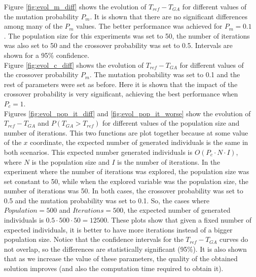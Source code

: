 \documentclass[10pt,a4paper]{article}
\begin{document}
Figure \ref{fig:evol_m_diff} shows the evolution of $T_{ref} - T_{GA}$ for different values of the mutation probability $P_m$. It is shown that there are no significant differences among many of the $P_m$ values. The better performance was achieved for $P_m = 0.1$. The population size for this experiments was set to 50, the number of iterations was also set to 50 and the crossover probability was set to 0.5. Intervals are shown for a 95\% confidence.\\

Figure \ref{fig:evol_c_diff} shows the evolution of $T_{ref} - T_{GA}$ for different values of the crossover probability $P_m$. The mutation probability was set to 0.1 and the rest of parameters were set as before. Here it is shown that the impact of the crossover probability is very significant, achieving the best performance when $P_c = 1$.\\

Figures \ref{fig:evol_pop_it_diff} and \ref{fig:evol_pop_it_worse} show the evolution of $T_{ref} - T_{GA}$ and $P(T_{GA} > T_{ref})$ for different values of the population size and number of iterations. This two functions are plot together because at some value of the $x$ coordinate, the expected number of generated individuals is the same in both scenarios. This expected number generated individuals is $O(P_c \cdot N \cdot I)$, where $N$ is the population size and $I$ is the number of iterations. In the experiment where the number of iterations was explored, the population size was set constant to 50, while when the explored variable was the population size, the number of iterations was 50. In both cases, the crossover probability was set to 0.5 and the mutation probability was set to 0.1. So, the cases where $Population = 500$ and $Iterations = 500$, the expected number of generated individuals is $0.5 \cdot 500 \cdot 50 = 12500$. These plots show that given a fixed number of expected individuals, it is better to have more iterations instead of a bigger population size. Notice that the confidence intervals for the $T_{ref} - T_{GA}$ curves do not overlap, so the differences are statistically significant (95\%). It is also shown that as we increase the value of these parameters, the quality of the obtained solution improves (and also the computation time required to obtain it).
\end{document}
